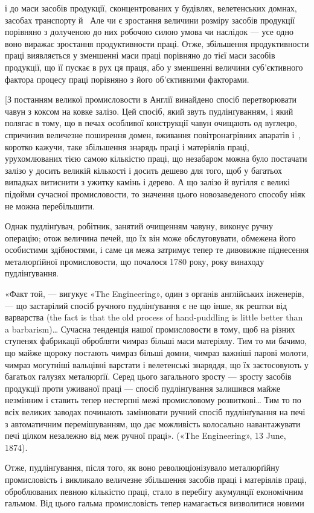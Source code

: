 \parcont{}  %
і до маси засобів продукції, сконцентрованих у будівлях, велетенських
домнах, засобах транспорту й~ Але чи є зростання
величини розміру засобів продукції порівняно з долученою до
них робочою силою умова чи наслідок — усе одно воно виражає
зростання продуктивности праці. Отже, збільшення продуктивности
праці виявляється у зменшенні маси праці порівняно до
тієї маси засобів продукції, що її пускає в рух ця праця, або у
зменшенні величини суб’єктивного фактора процесу праці порівняно
з його об’єктивними факторами.

[З постанням великої промисловости в Англії винайдено
спосіб перетворювати чавун з коксом на ковке залізо. Цей
спосіб, який звуть пудлінґуванням, і який полягає в тому, що
в печах особливої конструкції чавун очищають од вуглецю,
спричинив величезне поширення домен, вживання повітронагрівних
апаратів і~, коротко кажучи, таке збільшення знарядь
праці і матеріялів праці, урухомлюваних тією самою кількістю
праці, що незабаром можна було постачати залізо у досить великій
кількості і досить дешево для того, щоб у багатьох випадках
витиснити з ужитку камінь і дерево. А що залізо й вугілля є
великі підойми сучасної промисловости, то значення цього новозаведеного
способу ніяк не можна перебільшити.

Однак пудлінґувач, робітник, занятий очищенням чавуну,
виконує ручну операцію; отож величина печей, що їх він може
обслуговувати, обмежена його особистими здібностями, і саме
ця межа затримує тепер те дивовижне піднесення металюрґійної
промисловости, що почалося 1780 року, року винаходу пудлінґування.

«Факт той, — вигукує «The Engineering», один з органів
англійських інженерів, — що застарілий спосіб ручного пудлінґування
є не що інше, як рештки від варварства (the fact is that the old
process of hand-puddling is little better than a barbarism)\dots{}
Сучасна тенденція нашої промисловости в тому, щоб на різних
ступенях фабрикації обробляти чимраз більші маси матеріялу.
Тим то ми бачимо, що майже щороку постають чимраз
більші домни, чимраз важніші парові молоти, чимраз могутніші
вальцівні варстати і велетенські знаряддя, що їх застосовують
у багатьох галузях металюрґії. Серед цього загального зросту —
зросту засобів продукції проти уживаної праці — спосіб пудлінґування
залишився майже незмінним і ставить тепер нестерпні
межі промисловому розвиткові\dots{} Тим то по всіх великих заводах
починають замінювати ручний спосіб пудлінґування на
печі з автоматичним перемішуванням, що дає можливість колосально
навантажувати печі цілком незалежно від меж ручної
праці». («The Engineering», 13 June, 1874).

Отже, пудлінґування, після того, як воно революціонізувало
металюрґійну промисловість і викликало величезне збільшення
засобів праці і матеріялів праці, оброблюваних певною кількістю
праці, стало в перебігу акумуляції економічним гальмом. Від
цього гальма промисловість тепер намагається визволитися новими
\parbreak{}  %
